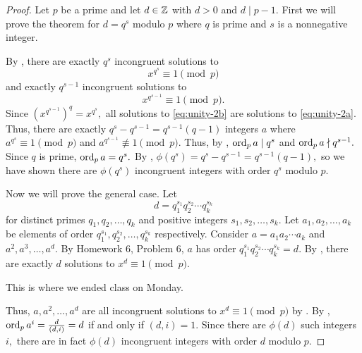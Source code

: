 \documentclass[letterpaper, 11 pt]{ximera}
\begin{document}
\begin{proof}
    Let $p$ be a prime and let $d\in\mathbb Z$ with $d>0$ and $d\mid p-1.$ First we will prove the theorem for $d=q^s$ modulo $p$ where $q$ is prime and $s$ is a nonnegative integer.

    By , there are exactly $q^s$ incongruent solutions to 
    \begin{equation}\label{eq:unity-2a}
        x^{q^s}\equiv 1\pmod{p}
    \end{equation} and exactly $q^{s-1}$ incongruent solutions to 
    \begin{equation}\label{eq:unity-2b}
        x^{q^{s-1}}\equiv 1\pmod{p}.
    \end{equation}
    Since $(x^{q^{s-1}})^q=x^{q^s},$ all solutions to \eqref{eq:unity-2b} are solutions to \eqref{eq:unity-2a}. 
    Thus, there are exactly $q^s-q^{s-1}=q^{s-1}(q-1)$ integers $a$ where $a^{q^s}\equiv 1\pmod{p}$ and $a^{q^{s-1}}\not\equiv 1\pmod{p}.$ Thus, by , $\operatorname{ord}_p a \mid q^s$ and $\operatorname{ord}_p a\nmid q^{s-1}.$ Since $q$ is prime, $\operatorname{ord}_p a =q^s.$ By , $\phi(q^s)=q^s-q^{s-1}=q^{s-1}(q-1),$ so we have shown there are $\phi(q^s)$ incongruent integers with order $q^s$ modulo $p$.

    Now we will prove the general case. Let 
    \[d=q_1^{s_1}q_2^{s_2}\cdots q_k^{s_k}\]
    for distinct primes $q_1,q_2,\dots,q_k$ and positive integers $s_1,s_2,\dots,s_k.$ Let $a_1,a_2,\dots,a_k$ be elements of order $q_1^{s_1},q_2^{s_2},\dots, q_k^{s_k}$ respectively.
    Consider $a=a_1a_2\cdots a_k$ and $a^2, a^3,\dots,a^d$. By Homework 6, Problem 6, $a$ has order $q_1^{s_1}q_2^{s_2}\cdots q_k^{s_k}=d.$ 
    By , there are exactly $d$ solutions to $x^d\equiv 1\pmod{p}$. \begin{annotation}
        This is where we ended class on Monday.
    \end{annotation}
    Thus, $a, a^2,\dots,a^d$ are all incongruent solutions to $x^d\equiv 1\pmod{p}$ by . 
    By ,
    $\operatorname{ord}_p a^i=\frac{d}{(d,i)}=d$ if and only if $(d,i)=1.$ Since there are $\phi(d)$ such integers $i,$ there are in fact $\phi(d)$ incongruent integers with order $d$ modulo $p.$
\end{proof}
\end{document}
